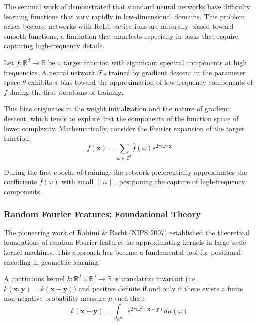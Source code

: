 The seminal work of \citet{tancik2020fourier} demonstrated that standard neural networks have difficulty learning functions that vary rapidly in low-dimensional domains. This problem arises because networks with \gls{ReLU} activations are naturally biased toward smooth functions, a limitation that manifests especially in tasks that require capturing high-frequency details.

\begin{theorem}
Let $f: \mathbb{R}^d \to \mathbb{R}$ be a target function with significant spectral components at high frequencies. A neural network $\mathcal{F}_\theta$ trained by gradient descent in the parameter space $\theta$ exhibits a bias toward the approximation of low-frequency components of $f$ during the first iterations of training.
\end{theorem}

This bias originates in the weight initialization and the nature of gradient descent, which tends to explore first the components of the function space of lower complexity. Mathematically, consider the Fourier expansion of the target function:
\begin{equation}
f(\mathbf{x}) = \sum_{\omega \in \mathbb{Z}^d} \hat{f}(\omega) e^{2\pi i \omega \cdot \mathbf{x}}
\end{equation}

During the first epochs of training, the network preferentially approximates the coefficients $\hat{f}(\omega)$ with small $\|\omega\|$, postponing the capture of high-frequency components.

\subsubsection{Random Fourier Features: Foundational Theory}

The pioneering work of Rahimi \& Recht (NIPS 2007) established the theoretical foundations of random Fourier features for approximating kernels in large-scale kernel machines. This approach has become a fundamental tool for positional encoding in geometric learning.

\begin{theorem}\label{thm:bochner}
A continuous kernel $k: \mathbb{R}^d \times \mathbb{R}^d \to \mathbb{R}$ is translation invariant (i.e., $k(\mathbf{x}, \mathbf{y}) = k(\mathbf{x} - \mathbf{y})$) and positive definite if and only if there exists a finite non-negative probability measure $\mu$ such that:
\begin{equation}
k(\mathbf{x} - \mathbf{y}) = \int_{\mathbb{R}^d} e^{2\pi i \omega^T (\mathbf{x} - \mathbf{y})} d\mu(\omega)
\end{equation}
\end{theorem}

